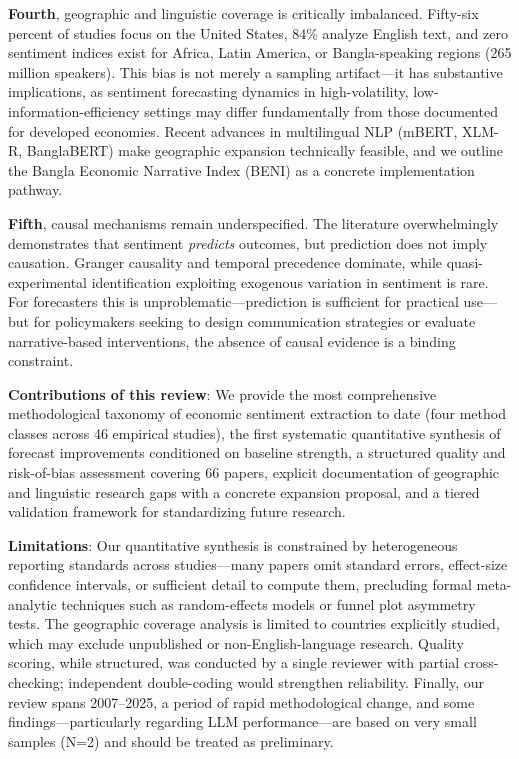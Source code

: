 \documentclass[11pt]{article}
\begin{document}
\textbf{Fourth}, geographic and linguistic coverage is critically imbalanced. Fifty-six percent of studies focus on the United States, 84\% analyze English text, and zero sentiment indices exist for Africa, Latin America, or Bangla-speaking regions (265 million speakers). This bias is not merely a sampling artifact---it has substantive implications, as sentiment forecasting dynamics in high-volatility, low-information-efficiency settings may differ fundamentally from those documented for developed economies. Recent advances in multilingual NLP (mBERT, XLM-R, BanglaBERT) make geographic expansion technically feasible, and we outline the Bangla Economic Narrative Index (BENI) as a concrete implementation pathway.

\textbf{Fifth}, causal mechanisms remain underspecified. The literature overwhelmingly demonstrates that sentiment \emph{predicts} outcomes, but prediction does not imply causation. Granger causality and temporal precedence dominate, while quasi-experimental identification exploiting exogenous variation in sentiment is rare. For forecasters this is unproblematic---prediction is sufficient for practical use---but for policymakers seeking to design communication strategies or evaluate narrative-based interventions, the absence of causal evidence is a binding constraint.

\textbf{Contributions of this review}: We provide the most comprehensive methodological taxonomy of economic sentiment extraction to date (four method classes across 46 empirical studies), the first systematic quantitative synthesis of forecast improvements conditioned on baseline strength, a structured quality and risk-of-bias assessment covering 66 papers, explicit documentation of geographic and linguistic research gaps with a concrete expansion proposal, and a tiered validation framework for standardizing future research.

\textbf{Limitations}: Our quantitative synthesis is constrained by heterogeneous reporting standards across studies---many papers omit standard errors, effect-size confidence intervals, or sufficient detail to compute them, precluding formal meta-analytic techniques such as random-effects models or funnel plot asymmetry tests. The geographic coverage analysis is limited to countries explicitly studied, which may exclude unpublished or non-English-language research. Quality scoring, while structured, was conducted by a single reviewer with partial cross-checking; independent double-coding would strengthen reliability. Finally, our review spans 2007--2025, a period of rapid methodological change, and some findings---particularly regarding LLM performance---are based on very small samples (N=2) and should be treated as preliminary.
\end{document}
